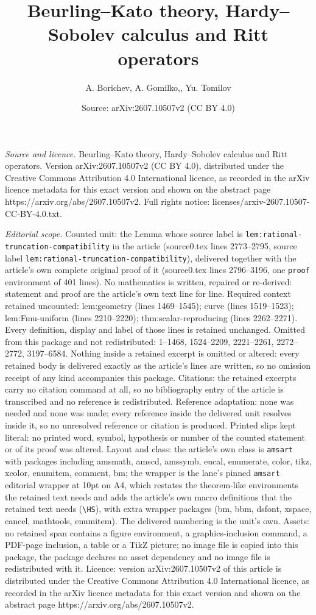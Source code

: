 \documentclass[10pt,a4paper]{amsart}
\title[Beurling--Kato theory, Hardy--Sobolev calculus and Ritt oper]{Beurling--Kato theory, Hardy--Sobolev calculus and Ritt operators}
\author{A. Borichev, A. Gomilko,, Yu. Tomilov}
\date{Source: arXiv:2607.10507v2 (CC BY 4.0)}
\begin{document}
\maketitle

\noindent\emph{Source and licence.} Beurling--Kato theory, Hardy--Sobolev calculus and Ritt operators. Version arXiv:2607.10507v2 (CC BY 4.0), distributed under the Creative Commons Attribution 4.0 International licence, as recorded in the arXiv licence metadata for this exact version and shown on the abstract page https://arxiv.org/abs/2607.10507v2. Full rights notice: licenses/arxiv-2607.10507-CC-BY-4.0.txt.\par\smallskip

\noindent\textit{Editorial scope.} Counted unit: the Lemma whose source label is \texttt{lem:rational-truncation-compatibility} in the article (source0.tex lines 2773--2795, source label \texttt{lem:rational-truncation-compatibility}), delivered together with the article's own complete original proof of it (source0.tex lines 2796--3196, one \texttt{proof} environment of 401 lines). No mathematics is written, repaired or re-derived: statement and proof are the article's own text line for line. Required context retained uncounted: lem:geometry (lines 1469--1545); curve (lines 1519--1523); lem:Fmu-uniform (lines 2210--2220); thm:scalar-reproducing (lines 2262--2271). Every definition, display and label of those lines is retained unchanged. Omitted from this package and not redistributed: 1--1468, 1524--2209, 2221--2261, 2272--2772, 3197--6584. Nothing inside a retained excerpt is omitted or altered: every retained body is delivered exactly as the article's lines are written, so no omission receipt of any kind accompanies this package. Citations: the retained excerpts carry no citation command at all, so no bibliography entry of the article is transcribed and no reference is redistributed. Reference adaptation: none was needed and none was made; every reference inside the delivered unit resolves inside it, so no unresolved reference or citation is produced. Printed slips kept literal: no printed word, symbol, hypothesis or number of the counted statement or of its proof was altered. Layout and class: the article's own class is \texttt{amsart} with packages including amsmath, amscd, amssymb, eucal, enumerate, color, tikz, xcolor, enumitem, comment, bm; the wrapper is the lane's pinned \texttt{amsart} editorial wrapper at 10pt on A4, which restates the theorem-like environments the retained text needs and adds the article's own macro definitions that the retained text needs (\texttt{\textbackslash HS}), with extra wrapper packages (bm, bbm, dsfont, xspace, cancel, mathtools, enumitem). The delivered numbering is the unit's own. Assets: no retained span contains a figure environment, a graphics-inclusion command, a PDF-page inclusion, a table or a TikZ picture; no image file is copied into this package, the package declares no asset dependency and no image file is redistributed with it. Licence: version arXiv:2607.10507v2 of this article is distributed under the Creative Commons Attribution 4.0 International licence, as recorded in the arXiv licence metadata for this exact version and shown on the abstract page https://arxiv.org/abs/2607.10507v2. 
\end{document}
